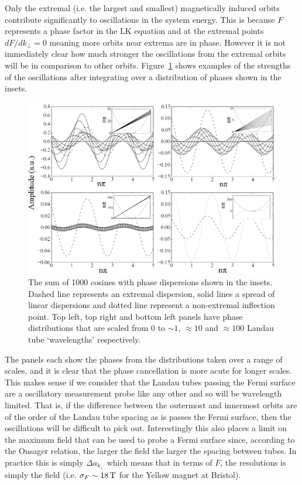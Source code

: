 Only the extremal (i.e. the largest and smallest) magnetically induced orbits contribute significantly to oscillations in the system energy. This is because $F$ represents a phase factor in the \ac{LK} equation and at the extremal points $dF/dk_\perp=0$ meaning more orbits near extrema are in phase. However it is not immediately clear how much stronger the oscillations from the extremal orbits will be in comparison to other orbits. Figure~\ref{Fig:2:ExtremalPhases} shows examples of the strengths of the oscillations after integrating over a distribution of phases shown in the insets.
\begin{figure}[htbp]
    \begin{center}
        \includegraphics[scale=0.8]{Chapter2-ExperimentalTechnique/Figures/ExtremalPhases/ExtremalPhases}
        \caption{The sum of 1000 cosines with phase dispersions shown in the insets. Dashed line represents an extremal dispersion, solid lines a spread of linear dispersions and dotted line represent a non-extremal inflection point. Top left, top right and bottom left panels have phase distributions that are scaled from $0$ to $\sim1$, $\approx10$ and $\approx100$ Landau tube `wavelengths' respectively.}
        \label{Fig:2:ExtremalPhases}
    \end{center}
\end{figure}
The panels each show the phases from the distributions taken over a range of scales, and it is clear that the phase cancellation is more acute for longer scales. This makes sense if we consider that the Landau tubes passing the Fermi surface are a oscillatory measurement probe like any other and so will be wavelength limited. That is, if the difference between the outermost and innermost orbits are of the order of the Landau tube spacing as is passes the Fermi surface, then the oscillations will be difficult to pick out. Interestingly this also places a limit on the maximum field that can be used to probe a Fermi surface since, according to the Onsager relation, the larger the field the larger the spacing between tubes. In practice this is simply $\Delta a_{k_\perp}$ which means that in terms of $F$, the resolutions is simply the field (i.e. $\sigma_F \sim \unit[18]{T}$ for the Yellow magnet at Bristol). 

